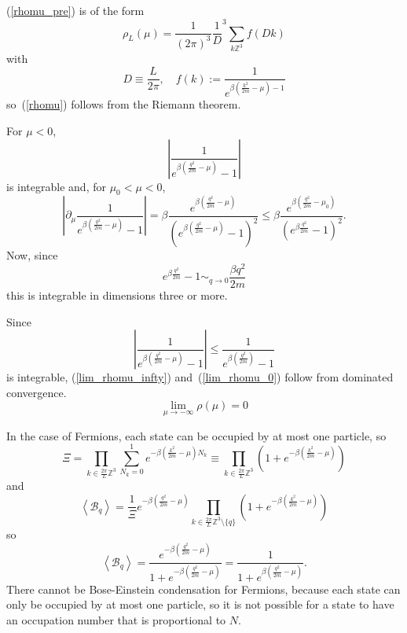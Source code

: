 \documentclass{ian}
\begin{document}
\point
(\ref{rhomu_pre}) is of the form
\begin{equation}
  \rho_L(\mu)
  =
  \frac1{(2\pi)^3}
  \frac1D^3\sum_{k\mathbb Z^3}f(Dk)
\end{equation}
with
\begin{equation}
  D\equiv\frac L{2\pi}
  ,\quad
  f(k):=\frac1{e^{\beta(\frac{k^2}{2m}-\mu)-1}}
\end{equation}
so\-~(\ref{rhomu}) follows from the Riemann theorem.
\bigskip

\point
For $\mu<0$,
\begin{equation}
  \left|\frac1{e^{\beta(\frac{q^2}{2m}-\mu)}-1}\right|
\end{equation}
is integrable and, for $\mu_0<\mu<0$,
\begin{equation}
  \left|\partial_\mu\frac1{e^{\beta(\frac{q^2}{2m}-\mu)}-1}\right|
  =
  \beta\frac{e^{\beta(\frac{q^2}{2m}-\mu)}}{(e^{\beta(\frac{q^2}{2m}-\mu)}-1)^2}
  \leqslant
  \beta\frac{e^{\beta(\frac{q^2}{2m}-\mu_0)}}{(e^{\beta\frac{q^2}{2m}}-1)^2}
  .
\end{equation}
Now, since
\begin{equation}
  e^{\beta\frac{q^2}{2m}}-1
  \sim_{q\to0}\frac{\beta q^2}{2m}
\end{equation}
this is integrable in dimensions three or more.
\bigskip

\point
Since
\begin{equation}
  \left|\frac1{e^{\beta(\frac{q^2}{2m}-\mu)}-1}\right|
  \leqslant
  \frac1{e^{\beta(\frac{q^2}{2m})}-1}
\end{equation}
is integrable, (\ref{lim_rhomu_infty}) and\-~(\ref{lim_rhomu_0}) follow from dominated convergence.
\begin{equation}
  \lim_{\mu\to-\infty}\rho(\mu)=0
\end{equation}

In the case of Fermions, each state can be occupied by at most one particle, so
\begin{equation}
  \Xi=
  \prod_{k\in\frac{2\pi}L\mathbb Z^3}
  \sum_{N_k=0}^1
  e^{-\beta(\frac{k^2}{2m}-\mu)N_k}
  \equiv
  \prod_{k\in\frac{2\pi}L\mathbb Z^3}
  \left(
    1+
    e^{-\beta(\frac{k^2}{2m}-\mu)}
  \right)
\end{equation}
and
\begin{equation}
  \left<\mathcal B_q\right>=
  \frac1\Xi
  e^{-\beta(\frac{q^2}{2m}-\mu)}
  \prod_{k\in\frac{2\pi}L\mathbb Z^3\setminus\{q\}}
  \left(
    1+
    e^{-\beta(\frac{k^2}{2m}-\mu)}
  \right)
\end{equation}
so
\begin{equation}
  \left<\mathcal B_q\right>=
  \frac{e^{-\beta(\frac{q^2}{2m}-\mu)}}
  {1+e^{-\beta(\frac{q^2}{2m}-\mu)}}
  =
  \frac{1}
  {1+e^{\beta(\frac{q^2}{2m}-\mu)}}
  .
\end{equation}
There cannot be Bose-Einstein condensation for Fermions, because each state can only be occupied by at most one particle, so it is not possible for a state to have an occupation number that is proportional to $N$.
\bigskip
\end{document}
